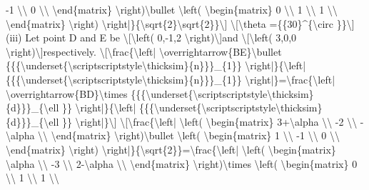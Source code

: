 -1 \textbackslash\textbackslash{} 0 \textbackslash\textbackslash{}
\textbackslash end\{matrix\} \textbackslash right)\textbackslash bullet
\textbackslash left( \textbackslash begin\{matrix\} 0 \textbackslash\textbackslash{}
1 \textbackslash\textbackslash{} 1 \textbackslash\textbackslash{}
\textbackslash end\{matrix\} \textbackslash right) \textbackslash right|\}\{\textbackslash sqrt\{2\}\textbackslash sqrt\{2\}\}\textbackslash{]}
\textbackslash{[}\textbackslash theta =\{\{30\}\textasciicircum\{\textbackslash circ
\}\}\textbackslash{]} (iii) Let point D and E be \textbackslash{[}\textbackslash left(
0,-1,2 \textbackslash right)\textbackslash{]}and \textbackslash{[}\textbackslash left(
3,0,0 \textbackslash right)\textbackslash{]}respectively. \textbackslash{[}\textbackslash frac\{\textbackslash left|
\textbackslash overrightarrow\{BE\}\textbackslash bullet \{\{\{\textbackslash underset\{\textbackslash scriptscriptstyle\textbackslash thicksim\}\{n\}\}\}\_\{1\}\}
\textbackslash right|\}\{\textbackslash left| \{\{\{\textbackslash underset\{\textbackslash scriptscriptstyle\textbackslash thicksim\}\{n\}\}\}\_\{1\}\}
\textbackslash right|\}=\textbackslash frac\{\textbackslash left|
\textbackslash overrightarrow\{BD\}\textbackslash times \{\{\{\textbackslash underset\{\textbackslash scriptscriptstyle\textbackslash thicksim\}\{d\}\}\}\_\{\textbackslash ell
\}\} \textbackslash right|\}\{\textbackslash left| \{\{\{\textbackslash underset\{\textbackslash scriptscriptstyle\textbackslash thicksim\}\{d\}\}\}\_\{\textbackslash ell
\}\} \textbackslash right|\}\textbackslash{]} \textbackslash{[}\textbackslash frac\{\textbackslash left|
\textbackslash left( \textbackslash begin\{matrix\} 3+\textbackslash alpha
\textbackslash\textbackslash{} -2 \textbackslash\textbackslash{}
-\textbackslash alpha \textbackslash\textbackslash{} \textbackslash end\{matrix\}
\textbackslash right)\textbackslash bullet \textbackslash left(
\textbackslash begin\{matrix\} 1 \textbackslash\textbackslash{}
-1 \textbackslash\textbackslash{} 0 \textbackslash\textbackslash{}
\textbackslash end\{matrix\} \textbackslash right) \textbackslash right|\}\{\textbackslash sqrt\{2\}\}=\textbackslash frac\{\textbackslash left|
\textbackslash left( \textbackslash begin\{matrix\} \textbackslash alpha
\textbackslash\textbackslash{} -3 \textbackslash\textbackslash{}
2-\textbackslash alpha \textbackslash\textbackslash{} \textbackslash end\{matrix\}
\textbackslash right)\textbackslash times \textbackslash left(
\textbackslash begin\{matrix\} 0 \textbackslash\textbackslash{}
1 \textbackslash\textbackslash{} 1 \textbackslash\textbackslash{}
